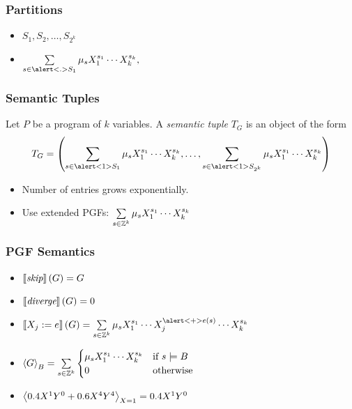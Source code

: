 \begin{frame}
	\frametitle{Partitions}
	\begin{itemize}[<+->]
		\item $ S_1, S_2, \ldots, S_{2^k} $
		\item $ \sum\limits_{s \in \alert<.>{S_1}} \mu_s \Xok, $ \\[10pt]
			\uncover<+->{
					$ \sum\limits_{s \in \alert<.>{S_2}} \mu_s \Xok, $ \\[10pt]
			}
			\uncover<+->{
					$ \vdots $ \\[10pt]
					$ \sum\limits_{s \in \alert<.>{S_{2^k}}} \mu_s \Xok $
			}
	\end{itemize}
\end{frame}

\begin{frame}
	\frametitle{Semantic Tuples}
	\begin{definition}
		Let $P$ be a program of $k$ variables.
		A \emph{semantic tuple} $T_G$ is an object of the form
		\[ T_G = \l( \sum_{s \in \alert<1>{S_1}} \mu_s \Xok, \ldots,
		\sum_{s \in \alert<1>{S_{2^k}}} \mu_s \Xok \r) \]
	\end{definition}
	\begin{itemize}
		\itemspacing{10pt}
		\item<2-> Number of entries grows exponentially.
		\item<3-> Use extended PGFs: $ \sum\limits_{s \in \mathbb{Z}^k} \mu_s X_1^{s_1} \cdots X_k^{s_k} $
	\end{itemize}
\end{frame}

\begin{frame}
	\frametitle{PGF Semantics}
	\begin{itemize}[<+->]
		\itemspacing{20pt}
		\item $\left\llbracket \textit{skip} \right\rrbracket(G) = G$
		\item $\left\llbracket \textit{diverge} \right\rrbracket(G) = 0$
		\item $\smtx{X_j := e}(G) = \sum\limits_{s \in \Z^k} \mu_s X_1^{s_1}
		\cdots X_j^{ \alert<+>{ e(s) } } \cdots X_k^{s_k}$
		\item $\left\langle G \right\rangle_{B} = \sum\limits_{s \in \mathbb{Z}^k} \begin{cases}
				\mu_s X_1^{s_1} \cdots X_k^{s_k} &\text{if } s \models B \\
				0 & \text{otherwise}
			\end{cases}$
		\item $ \left\langle 0.4 X^1 Y^0 + 0.6 X^4 Y^4 \right\rangle_{X = 1} = 0.4 X^1 Y^0 $
	\end{itemize}
\end{frame}

